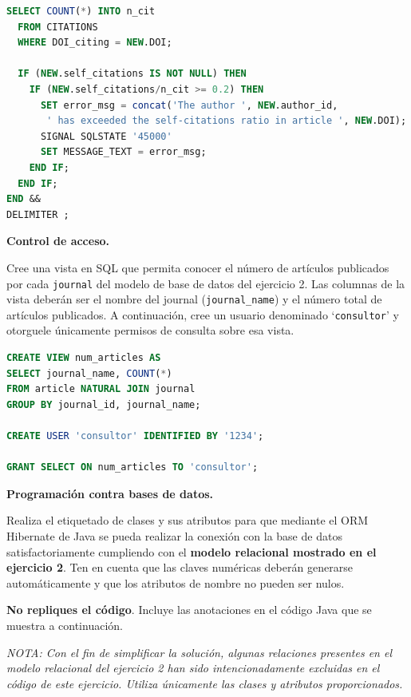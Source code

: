 \documentclass[
    12pt,
    a4paper,
    addpoints,
    answers,
    convocatoria=ext,
    titulacion=NoCD,
    curso=2023/2024,
]{db-exam}
\begin{document}
\begin{questions}
\begin{parts}
\begin{solution}[30em]
\begin{lstlisting}[language=SQL]
  SELECT COUNT(*) INTO n_cit
  FROM CITATIONS
  WHERE DOI_citing = NEW.DOI;
  
  IF (NEW.self_citations IS NOT NULL) THEN
    IF (NEW.self_citations/n_cit >= 0.2) THEN
      SET error_msg = concat('The author ', NEW.author_id, 
       ' has exceeded the self-citations ratio in article ', NEW.DOI);
      SIGNAL SQLSTATE '45000'
      SET MESSAGE_TEXT = error_msg;
    END IF;
  END IF;
END &&
DELIMITER ;
\end{lstlisting}
\end{solution}
\end{parts}

\newpage
\question[1] \textbf{Control de acceso.}

Cree una vista en SQL que permita conocer el número de artículos publicados por cada \texttt{journal} del modelo de base de datos del ejercicio 2. Las columnas de la vista deberán ser el nombre del journal (\texttt{journal\_name}) y el número total de artículos publicados. A continuación, cree un usuario denominado `\texttt{consultor}' y otorguele únicamente permisos de consulta sobre esa vista.
        
\begin{solution}[16em]
\begin{lstlisting}[language=SQL]
CREATE VIEW num_articles AS 
SELECT journal_name, COUNT(*)
FROM article NATURAL JOIN journal
GROUP BY journal_id, journal_name;

CREATE USER 'consultor' IDENTIFIED BY '1234';

GRANT SELECT ON num_articles TO 'consultor';
\end{lstlisting}
\end{solution}

\newpage
\question[1] \textbf{Programación contra bases de datos.}

Realiza el etiquetado de clases y sus atributos para que mediante el ORM Hibernate de Java se pueda realizar la conexión con la base de datos satisfactoriamente cumpliendo con el \textbf{modelo relacional mostrado en el ejercicio 2}. Ten en cuenta que las claves numéricas deberán generarse automáticamente y que los atributos de nombre no pueden ser nulos.

\textbf{No repliques el código}. Incluye las anotaciones en el código Java que se muestra a continuación.

\textit{NOTA: Con el fin de simplificar la solución, algunas relaciones presentes en el modelo relacional del ejercicio 2 han sido intencionadamente excluidas en el código de este ejercicio. Utiliza únicamente las clases y atributos proporcionados.}


\end{questions}
\end{document}
